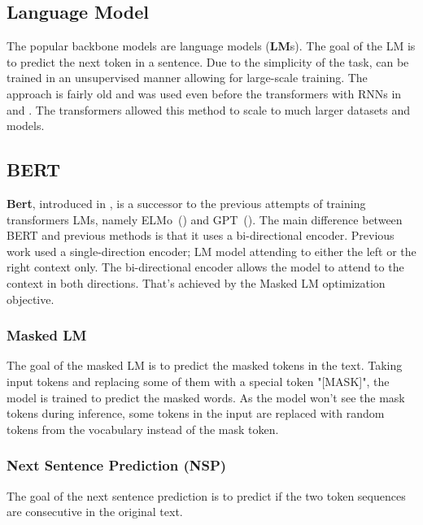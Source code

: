 \subsection{Language Model}
The popular backbone models are language models (\textbf{LM}s). The goal of the LM is to predict the next token in a sentence.
Due to the simplicity of the task, can be trained in an unsupervised manner allowing for large-scale training.
The approach is fairly old and was used even before the transformers with RNNs
in \cite{daiSemisupervisedSequenceLearning2015} and \cite{petersSemisupervisedSequenceTagging2017}.
The transformers allowed this method to scale to much larger datasets and models.

\subsection{BERT}
\textbf{Bert}, introduced in \cite{devlinBERTPretrainingDeep2019a}, is a successor to the previous attempts of training transformers LMs, namely ELMo~(\cite{petersDeepContextualizedWord2018}) and GPT~(\cite{howardUniversalLanguageModel2018a}).
The main difference between BERT and previous methods is that it uses a bi-directional encoder.
Previous work used a single-direction encoder; LM model attending to either the left or the right context only.
The bi-directional encoder allows the model to attend to the context in both directions.
That's achieved by the Masked LM optimization objective.

\subsubsection{Masked LM}
\label{sec:masked-lm}
The goal of the masked LM is to predict the masked tokens in the text.
Taking input tokens and replacing some of them with a special token "[MASK]", the model is trained to predict the masked words.
As the model won't see the mask tokens during inference, some tokens in the input are replaced with random tokens from the vocabulary instead of the mask token.

\subsubsection{Next Sentence Prediction (NSP)}
The goal of the next sentence prediction is to predict if the two token sequences are consecutive in the original text.

